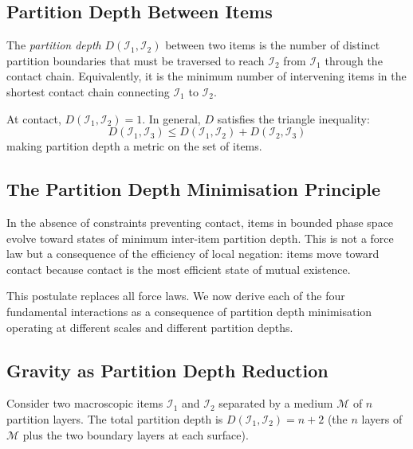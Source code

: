 \subsection{Partition Depth Between Items}
\label{subsec:depth_between}

\begin{definition}
\label{def:inter_depth}
The \emph{partition depth} $D(\mathcal{I}_1, \mathcal{I}_2)$ between two items
is the number of distinct partition boundaries that must be traversed to reach
$\mathcal{I}_2$ from $\mathcal{I}_1$ through the contact chain. Equivalently,
it is the minimum number of intervening items in the shortest contact chain
connecting $\mathcal{I}_1$ to $\mathcal{I}_2$.
\end{definition}

At contact, $D(\mathcal{I}_1, \mathcal{I}_2) = 1$. In general, $D$ satisfies
the triangle inequality:
\begin{equation}
    D(\mathcal{I}_1, \mathcal{I}_3) \leq D(\mathcal{I}_1, \mathcal{I}_2) +
    D(\mathcal{I}_2, \mathcal{I}_3)
    \label{eq:triangle}
\end{equation}
making partition depth a metric on the set of items.

\subsection{The Partition Depth Minimisation Principle}
\label{subsec:pdm}

\begin{postulate}
\label{post:pdm}
In the absence of constraints preventing contact, items in bounded phase space
evolve toward states of minimum inter-item partition depth. This is not a
force law but a consequence of the efficiency of local negation: items move
toward contact because contact is the most efficient state of mutual existence.
\end{postulate}

This postulate replaces all force laws. We now derive each of the four
fundamental interactions as a consequence of partition depth minimisation
operating at different scales and different partition depths.

\subsection{Gravity as Partition Depth Reduction}
\label{subsec:gravity}

Consider two macroscopic items $\mathcal{I}_1$ and $\mathcal{I}_2$ separated by
a medium $\mathcal{M}$ of $n$ partition layers. The total partition depth is
$D(\mathcal{I}_1, \mathcal{I}_2) = n + 2$ (the $n$ layers of $\mathcal{M}$
plus the two boundary layers at each surface).

